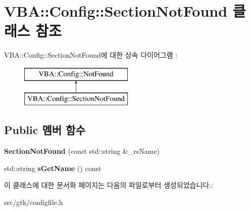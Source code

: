 \hypertarget{class_v_b_a_1_1_config_1_1_section_not_found}{}\section{V\+BA\+:\+:Config\+:\+:Section\+Not\+Found 클래스 참조}
\label{class_v_b_a_1_1_config_1_1_section_not_found}
V\+BA\+:\+:Config\+:\+:Section\+Not\+Found에 대한 상속 다이어그램 \+: \begin{figure}[H]
\begin{center}
\leavevmode
\includegraphics[height=2.000000cm]{class_v_b_a_1_1_config_1_1_section_not_found}
\end{center}
\end{figure}
\subsection*{Public 멤버 함수}
\begin{DoxyCompactItemize}
\item 
\mbox{\label{class_v_b_a_1_1_config_1_1_section_not_found_aeb897a2e04241f06da0bb12a972e65ff}} 
{\bfseries Section\+Not\+Found} (const std\+::string \&\+\_\+rs\+Name)
\item 
\mbox{\label{class_v_b_a_1_1_config_1_1_section_not_found_a0c718b305a09b59b4887654f24a218c9}} 
std\+::string {\bfseries s\+Get\+Name} () const
\end{DoxyCompactItemize}


이 클래스에 대한 문서화 페이지는 다음의 파일로부터 생성되었습니다.\+:\begin{DoxyCompactItemize}
\item 
src/gtk/configfile.\+h\end{DoxyCompactItemize}
